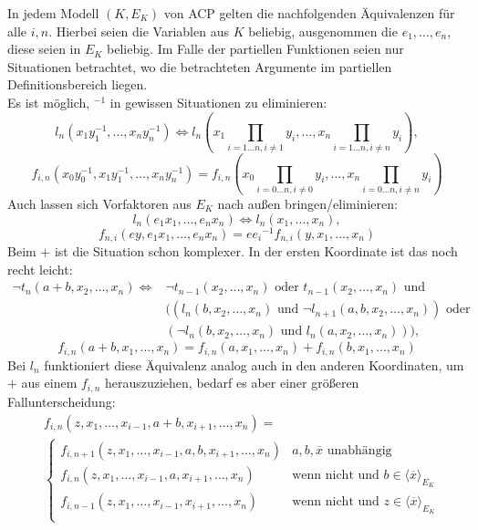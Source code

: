     \begin{fact}\label{Eliminierungsregeln}
    	In jedem Modell $(K,E_K)$ von ACP gelten die nachfolgenden Äquivalenzen für alle $i,n$. Hierbei seien die Variablen aus $K$ beliebig, ausgenommen die $e_1,\dots,e_n$, diese seien in $E_K$ beliebig. Im Falle der partiellen Funktionen seien nur Situationen betrachtet, wo die betrachteten Argumente im partiellen Definitionsbereich liegen.\\
    	Es ist möglich, \glqq{}$^{-1}$\grqq{} in gewissen Situationen zu eliminieren:
    	$$l_n(x_1y_1^{-1},\dots,x_ny_n^{-1})\Leftrightarrow l_n\left(x_1\prod\limits_{i=1\dots n,i\neq 1}y_i,\dots,x_n\prod\limits_{i=1\dots n,i\neq n}y_i\right),$$
    	$$f_{i,n}(x_0y_0^{-1},x_1y_1^{-1},\dots,x_ny_n^{-1})= f_{i,n}\left(x_0\prod\limits_{i=0\dots n,i\neq 0}y_i,\dots,x_n\prod\limits_{i=0\dots n,i\neq n}y_i\right)$$
    	Auch lassen sich Vorfaktoren aus $E_K$ nach außen bringen/eliminieren:
    	$$l_n(e_1x_1,\dots,e_nx_n)\Leftrightarrow l_n(x_1,\dots,x_n),$$
    	$$f_{n,i}(ey,e_1x_1,\dots,e_nx_n)=e{e_i}^{-1}f_{n,i}(y,x_1,\dots,x_n)$$
    	Beim \glqq{}$+$\grqq{} ist die Situation schon komplexer. In der ersten Koordinate ist das noch recht leicht:
    	\begin{align*}
    	\neg t_n(a+b,x_2,\dots,x_n)\Leftrightarrow&\neg t_{n-1}(x_2,\dots,x_n)\text{ oder }t_{n-1}(x_2,\dots,x_n)\text{ und }\\&((l_n(b,x_2,\dots,x_n)\text{ und }\neg l_{n+1}(a,b,x_2,\dots,x_n))\text{ oder }\\&(\neg l_n(b,x_2,\dots,x_n)\text{ und }l_n(a,x_2,\dots,x_n))),
    	\end{align*}
    	$$f_{i,n}(a+b,x_1,\dots,x_n)=f_{i,n}(a,x_1,\dots,x_n)+f_{i,n}(b,x_1,\dots,x_n)$$\newpage
    	Bei $l_n$ funktioniert diese Äquivalenz analog auch in den anderen Koordinaten, um \glqq{}$+$\grqq{} aus einem $f_{i,n}$ herauszuziehen, bedarf es aber einer größeren Fallunterscheidung:
    	\begin{align*}
    	&f_{i,n}(z,x_1,\dots,x_{i-1},a+b,x_{i+1},\dots,x_n)=\\
    	&\left\{\begin{array}{ll}
    	f_{i,n+1}(z,x_1,\dots,x_{i-1},a,b,x_{i+1},\dots,x_n)& a,b,\overline{x}\text{ unabhängig}\\
    	f_{i,n}(z,x_1,\dots,x_{i-1},a,x_{i+1},\dots,x_n)&\text{wenn nicht und }b\in\langle\overline{x}\rangle_{E_K}\\
    	f_{i,n-1}(z,x_1,\dots,x_{i-1},x_{i+1},\dots,x_n)&\text{wenn nicht und }z\in\langle\overline{x}\rangle_{E_K}\\

\end{array}
\end{align*}
\end{fact}
